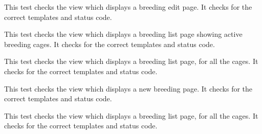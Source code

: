 \documentclass[letterpaper,10pt,english]{sphinxmanual}
\begin{document}
\begin{fulllineitems}
\begin{fulllineitems}
\label{api:mousedb.animal.tests.BreedingViewTests.test_breeding_edit}
This test checks the view which displays a breeding edit page.  It checks for the correct templates and status code.

\end{fulllineitems}



\begin{fulllineitems}
\label{api:mousedb.animal.tests.BreedingViewTests.test_breeding_list}
This test checks the view which displays a breeding list page showing active breeding cages.  It checks for the correct templates and status code.

\end{fulllineitems}



\begin{fulllineitems}
\label{api:mousedb.animal.tests.BreedingViewTests.test_breeding_list_all}
This test checks the view which displays a breeding list page, for all the cages.  It checks for the correct templates and status code.

\end{fulllineitems}



\begin{fulllineitems}
\label{api:mousedb.animal.tests.BreedingViewTests.test_breeding_new}
This test checks the view which displays a new breeding page.  It checks for the correct templates and status code.

\end{fulllineitems}



\begin{fulllineitems}
\label{api:mousedb.animal.tests.BreedingViewTests.test_timed_mating_list}
This test checks the view which displays a breeding list page, for all the cages.  It checks for the correct templates and status code.

\end{fulllineitems}


\end{fulllineitems}
\end{document}

